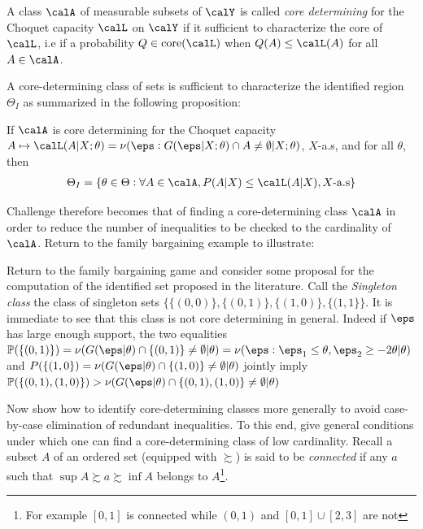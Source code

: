 \begin{definition}
	\label{def:GH-7}
	A class $\calA$ of measurable subsets of $\calY$ is called \emph{core determining} for the Choquet capacity $\calL$ on $\calY$ if it sufficient to characterize the core of $\calL$, i.e if a probability $Q \in \text{core}(\calL)$ when $Q(A) \leq \calL(A)$ for all $A\in\calA$.
\end{definition}

A core-determining class of sets is sufficient to characterize the identified region $\Theta_I$ as summarized in the following proposition:
\begin{prop}
	\label{prop:GH-1}
	If $\calA$ is core determining for the Choquet capacity $A\mapsto\calL(A|X;\theta) = \nu(\eps:G(\eps|X;\theta)\cap A \neq \emptyset | X;\theta)$, $X$-a.s, and for all $\theta$, then
	\begin{align*}
	 	\Theta_I = \{\theta\in \Theta: \forall A\in\calA, P(A|X) \leq \calL(A|X), X\text{-a.s}\}
	 \end{align*} 
\end{prop}
Challenge therefore becomes that of finding a core-determining class $\calA$ in order to reduce the number of inequalities to be checked to the cardinality of $\calA$. Return to the family bargaining example to illustrate:
\begin{example*}
	Return to the family bargaining game and consider some proposal for the computation of the identified set proposed in the literature. Call the \emph{Singleton class} the class of singleton sets $\{\{(0,0)\},\{(0,1)\},\{(1,0)\}, \{(1,1\}\}$. It is immediate to see that this class is not core determining in general. Indeed if $\eps$ has large enough support, the two equalities $\P(\{(0,1)\}) = \nu(G(\eps|\theta)\cap\{(0,1)\}\neq \emptyset|\theta) = \nu(\eps:\eps_1 \leq\theta, \eps_2 \geq -2\theta|\theta)$ and $P(\{(1,0\}) = \nu(G(\eps|\theta)\cap\{(1,0)\}\neq \emptyset|\theta)$ jointly imply $\P(\{(0,1),(1,0)\}) > \nu(G(\eps|\theta)\cap\{(0,1),(1,0)\}\neq \emptyset|\theta)$
\end{example*}

Now show how to identify core-determining classes more generally to avoid case-by-case elimination of redundant inequalities. To this end, give general conditions under which one can find a core-determining class of low cardinality. Recall a subset $A$ of an ordered set (equipped with $\succsim$) is said to be \emph{connected} if any $a$ such that $\sup A \succsim a \succsim \inf A$ belongs to $A$\footnote{For example $[0,1]$ is connected while $(0,1)$ and $[0,1] \cup [2,3]$ are not}.

